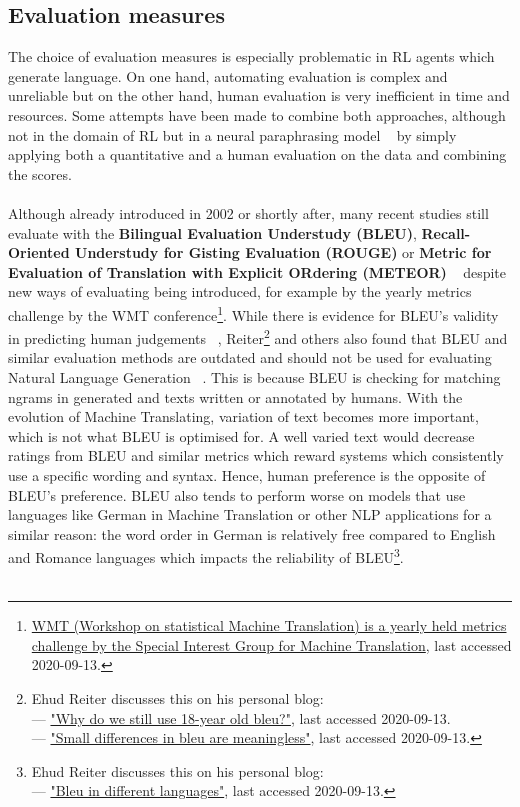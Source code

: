 \documentclass[11pt]{article}
\begin{document}
\subsection{Evaluation measures}\label{evaluation}
The choice of evaluation measures is especially problematic in RL agents which generate language. On one hand, automating evaluation is complex and unreliable but on the other hand, human evaluation is very inefficient in time and resources. Some attempts have been made to combine both approaches, although not in the domain of RL but in a neural paraphrasing model ~\cite{goyal-durrett-2020-neural} by simply applying both a quantitative and a human evaluation on the data and combining the scores. \\\\
Although already introduced in 2002 or shortly after, many recent studies still evaluate with the \textbf{Bilingual Evaluation Understudy (BLEU)}, \textbf{Recall-Oriented Understudy for Gisting Evaluation (ROUGE)} or \textbf{Metric for Evaluation of Translation with Explicit ORdering (METEOR)} ~\cite{lin-2004-rouge,banerjee-lavie-2005-meteor} despite new ways of evaluating being introduced, for example by the yearly metrics challenge by the WMT conference\footnote{\hyperlink{http://www.sigmt.org/}{WMT (Workshop on statistical Machine Translation) is a yearly held metrics challenge by the Special Interest Group for Machine Translation}, last accessed 2020-09-13.}. While there is evidence for BLEU's validity in predicting human judgements ~\cite{reiter-2018-astructured}, Reiter\footnote{Ehud Reiter discusses this on his personal blog:\\ --- \hyperlink{https://ehudreiter.com/2020/03/02/why-use-18-year-old-bleu/}{"Why do we still use 18-year old bleu?"}, last accessed 2020-09-13. \\ --- \hyperlink{https://ehudreiter.com/2020/07/28/small-differences-in-bleu-are-meaningless/}{"Small differences in bleu are meaningless"}, last accessed 2020-09-13.} and others also found that BLEU and similar evaluation methods are outdated and should not be used for evaluating Natural Language Generation ~\cite{reiter-2018-astructured,mathur-etal-2020-tangled}. This is because BLEU is checking for matching ngrams in generated and texts written or annotated by humans. With the evolution of Machine Translating, variation of text becomes more important, which is not what BLEU is optimised for. A well varied text would decrease ratings from BLEU and similar metrics which reward systems which consistently use a specific wording and syntax. Hence, human preference is the opposite of BLEU's preference. BLEU also tends to perform worse on models that use languages like German in Machine Translation or other NLP applications for a similar reason: the word order in German is relatively free compared to English and Romance languages which impacts the reliability of BLEU\footnote{Ehud Reiter discusses this on his personal blog: \\ --- \hyperlink{https://ehudreiter.com/2018/06/20/bleu-in-different-languages/}{"Bleu   in   different   languages"}, last accessed 2020-09-13.}.\\\\
\end{document}
